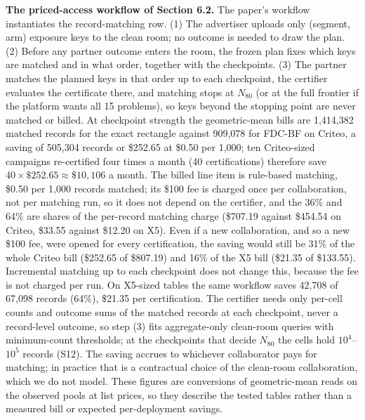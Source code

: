 \documentclass[sigconf,anonymous,review]{acmart}
\begin{document}
\textbf{The priced-access workflow of Section 6.2.} The paper's workflow instantiates the record-matching row. (1) The advertiser uploads only (segment, arm) exposure keys to the clean room; no outcome is needed to draw the plan. (2) Before any partner outcome enters the room, the frozen plan fixes which keys are matched and in what order, together with the checkpoints. (3) The partner matches the planned keys in that order up to each checkpoint, the certifier evaluates the certificate there, and matching stops at $N_{80}$ (or at the full frontier if the platform wants all 15 problems), so keys beyond the stopping point are never matched or billed. At checkpoint strength the geometric-mean bills are 1,414,382 matched records for the exact rectangle against 909,078 for FDC-BF on Criteo, a saving of 505,304 records or \$252.65 at \$0.50 per 1,000; ten Criteo-sized campaigns re-certified four times a month (40 certifications) therefore save $40 \times \$252.65 \approx \$10{,}106$ a month. The billed line item is rule-based matching, \$0.50 per 1,000 records matched; its \$100 fee is charged once per collaboration, not per matching run, so it does not depend on the certifier, and the 36\% and 64\% are shares of the per-record matching charge (\$707.19 against \$454.54 on Criteo, \$33.55 against \$12.20 on X5). Even if a new collaboration, and so a new \$100 fee, were opened for every certification, the saving would still be 31\% of the whole Criteo bill (\$252.65 of \$807.19) and 16\% of the X5 bill (\$21.35 of \$133.55). Incremental matching up to each checkpoint does not change this, because the fee is not charged per run. On X5-sized tables the same workflow saves 42,708 of 67,098 records (64\%), \$21.35 per certification. The certifier needs only per-cell counts and outcome sums of the matched records at each checkpoint, never a record-level outcome, so step (3) fits aggregate-only clean-room queries with minimum-count thresholds; at the checkpoints that decide $N_{80}$ the cells hold $10^4$--$10^5$ records (S12). The saving accrues to whichever collaborator pays for matching; in practice that is a contractual choice of the clean-room collaboration, which we do not model. These figures are conversions of geometric-mean reads on the observed pools at list prices, so they describe the tested tables rather than a measured bill or expected per-deployment savings.
\end{document}
